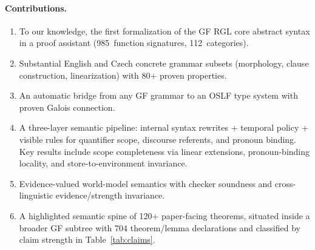 \documentclass[11pt]{article}
\newcommand{\OSLF}{\textup{OSLF}}
\newcommand{\GF}{\textup{GF}}
\newcommand{\RGL}{\textup{RGL}}
\begin{document}
\paragraph{Contributions.}
\begin{enumerate}
\item To our knowledge, the first formalization of the \GF{} \RGL{} core abstract
  syntax in a proof assistant (985~function signatures, 112~categories).
\item Substantial English and Czech concrete grammar subsets (morphology,
  clause construction, linearization) with 80+ proven properties.
\item An automatic bridge from any \GF{} grammar to an \OSLF{} type system
  with proven Galois connection.
\item A three-layer semantic pipeline: internal syntax rewrites + temporal
  policy + visible rules for quantifier scope, discourse referents,
  and pronoun binding.  Key results include scope completeness via
  linear extensions, pronoun-binding locality, and store-to-environment
  invariance.
\item Evidence-valued world-model semantics with checker soundness and
  cross-linguistic evidence/strength invariance.
\item A highlighted semantic spine of 120+ paper-facing theorems,
  situated inside a broader \GF{} subtree with 704 theorem/lemma
  declarations and classified by claim strength in
  Table~\ref{tab:claims}.
\end{enumerate}
\end{document}

